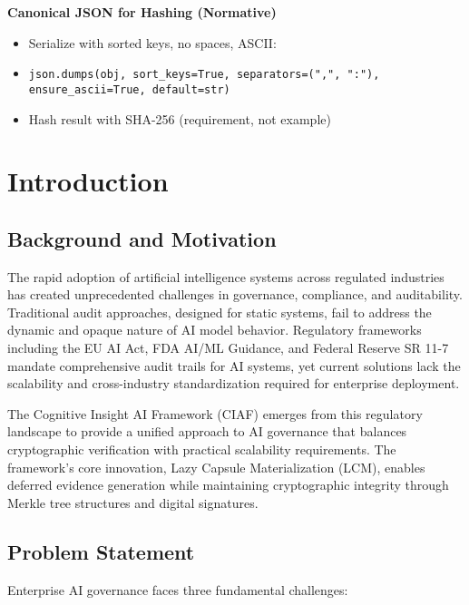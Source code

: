 \documentclass[12pt,a4paper]{article}
\begin{document}
\begin{infobox}
\textbf{Canonical JSON for Hashing (Normative)}
\begin{itemize}
\item Serialize with sorted keys, no spaces, ASCII:
\item \texttt{json.dumps(obj, sort\_keys=True, separators=(",", ":"), ensure\_ascii=True, default=str)}
\item Hash result with SHA-256 (requirement, not example)
\end{itemize}
\end{infobox}

\newpage
\tableofcontents
\newpage

\section{Introduction}

\subsection{Background and Motivation}

The rapid adoption of artificial intelligence systems across regulated industries has created unprecedented challenges in governance, compliance, and auditability. Traditional audit approaches, designed for static systems, fail to address the dynamic and opaque nature of AI model behavior. Regulatory frameworks including the EU AI Act, FDA AI/ML Guidance, and Federal Reserve SR 11-7 mandate comprehensive audit trails for AI systems, yet current solutions lack the scalability and cross-industry standardization required for enterprise deployment.

The Cognitive Insight AI Framework (CIAF) emerges from this regulatory landscape to provide a unified approach to AI governance that balances cryptographic verification with practical scalability requirements. The framework's core innovation, Lazy Capsule Materialization (LCM\texttrademark), enables deferred evidence generation while maintaining cryptographic integrity through Merkle tree structures and digital signatures.

\subsection{Problem Statement}

Enterprise AI governance faces three fundamental challenges:
\end{document}
